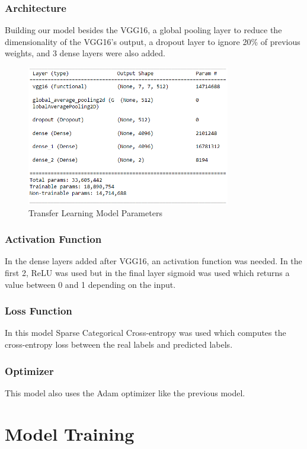 \documentclass[conference]{IEEEtran}
\begin{document}
\subsubsection{Architecture}
Building our model besides the VGG16, a global pooling layer to reduce the dimensionality of the VGG16's output, a dropout layer to ignore 20\% of previous weights, and 3 dense layers were also added.

\begin{figure}[H]
    \centering
    \includegraphics[width=3.5in]{transferl_model.PNG}
    \caption{Transfer Learning Model Parameters}\label{fig:fig5}
\end{figure}

\subsubsection{Activation Function}
In the dense layers added after VGG16, an activation function was needed. In the first 2, ReLU was used but in the final layer sigmoid was used which returns a value between 0 and 1 depending on the input.\\

\subsubsection{Loss Function}

In this model Sparse Categorical Cross-entropy was used which computes the cross-entropy loss between the real labels and predicted labels.\\

\subsubsection{Optimizer}
This model also uses the Adam optimizer like the previous model.

\section{Model Training}
\end{document}
